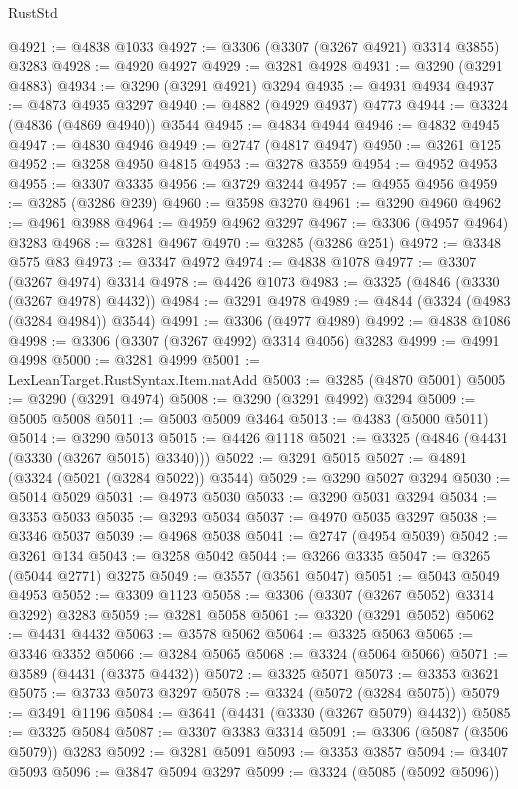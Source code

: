 \begin{lexlean}{RustStd}
\begin{coremodule}
@4921 := @4838 @1033
@4927 := @3306 (@3307 (@3267 @4921) @3314 @3855) @3283
@4928 := @4920 @4927
@4929 := @3281 @4928
@4931 := @3290 (@3291 @4883)
@4934 := @3290 (@3291 @4921) @3294
@4935 := @4931 @4934
@4937 := @4873 @4935 @3297
@4940 := @4882 (@4929 @4937) @4773
@4944 := @3324 (@4836 (@4869 @4940)) @3544
@4945 := @4834 @4944
@4946 := @4832 @4945
@4947 := @4830 @4946
@4949 := @2747 (@4817 @4947)
@4950 := @3261 @125
@4952 := @3258 @4950 @4815
@4953 := @3278 @3559
@4954 := @4952 @4953
@4955 := @3307 @3335
@4956 := @3729 @3244
@4957 := @4955 @4956
@4959 := @3285 (@3286 @239)
@4960 := @3598 @3270
@4961 := @3290 @4960
@4962 := @4961 @3988
@4964 := @4959 @4962 @3297
@4967 := @3306 (@4957 @4964) @3283
@4968 := @3281 @4967
@4970 := @3285 (@3286 @251)
@4972 := @3348 @575 @83
@4973 := @3347 @4972
@4974 := @4838 @1078
@4977 := @3307 (@3267 @4974) @3314
@4978 := @4426 @1073
@4983 := @3325 (@4846 (@3330 (@3267 @4978) @4432))
@4984 := @3291 @4978
@4989 := @4844 (@3324 (@4983 (@3284 @4984)) @3544)
@4991 := @3306 (@4977 @4989)
@4992 := @4838 @1086
@4998 := @3306 (@3307 (@3267 @4992) @3314 @4056) @3283
@4999 := @4991 @4998
@5000 := @3281 @4999
@5001 := LexLeanTarget.RustSyntax.Item.natAdd
@5003 := @3285 (@4870 @5001)
@5005 := @3290 (@3291 @4974)
@5008 := @3290 (@3291 @4992) @3294
@5009 := @5005 @5008
@5011 := @5003 @5009 @3464
@5013 := @4383 (@5000 @5011)
@5014 := @3290 @5013
@5015 := @4426 @1118
@5021 := @3325 (@4846 (@4431 (@3330 (@3267 @5015) @3340)))
@5022 := @3291 @5015
@5027 := @4891 (@3324 (@5021 (@3284 @5022)) @3544)
@5029 := @3290 @5027 @3294
@5030 := @5014 @5029
@5031 := @4973 @5030
@5033 := @3290 @5031 @3294
@5034 := @3353 @5033
@5035 := @3293 @5034
@5037 := @4970 @5035 @3297
@5038 := @3346 @5037
@5039 := @4968 @5038
@5041 := @2747 (@4954 @5039)
@5042 := @3261 @134
@5043 := @3258 @5042
@5044 := @3266 @3335
@5047 := @3265 (@5044 @2771) @3275
@5049 := @3557 (@3561 @5047)
@5051 := @5043 @5049 @4953
@5052 := @3309 @1123
@5058 := @3306 (@3307 (@3267 @5052) @3314 @3292) @3283
@5059 := @3281 @5058
@5061 := @3320 (@3291 @5052)
@5062 := @4431 @4432
@5063 := @3578 @5062
@5064 := @3325 @5063
@5065 := @3346 @3352
@5066 := @3284 @5065
@5068 := @3324 (@5064 @5066)
@5071 := @3589 (@4431 (@3375 @4432))
@5072 := @3325 @5071
@5073 := @3353 @3621
@5075 := @3733 @5073 @3297
@5078 := @3324 (@5072 (@3284 @5075))
@5079 := @3491 @1196
@5084 := @3641 (@4431 (@3330 (@3267 @5079) @4432))
@5085 := @3325 @5084
@5087 := @3307 @3383 @3314
@5091 := @3306 (@5087 (@3506 @5079)) @3283
@5092 := @3281 @5091
@5093 := @3353 @3857
@5094 := @3407 @5093
@5096 := @3847 @5094 @3297
@5099 := @3324 (@5085 (@5092 @5096))

\end{coremodule}
\end{lexlean}
